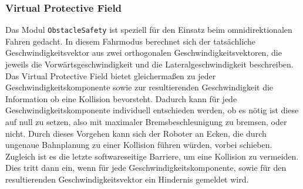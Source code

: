 \subsubsection{Virtual Protective Field}
\label{bahnplanung_virtual_protective_field_sec}

Das Modul \lstinline{ObstacleSafety} ist speziell für den Einsatz beim omnidirektionalen Fahren gedacht. In diesem Fahrmodus berechnet sich der tatsächliche Geschwindigkeitsvektor aus zwei orthogonalen Geschwindigkeitsvektoren, die jeweils die Vorwärtsgeschwindigkeit und die Lateralgeschwindigkeit beschreiben. Das Virtual Protective Field bietet gleichermaßen zu jeder Geschwindigkeitskomponente sowie zur resultierenden Geschwindigkeit die Information ob eine Kollision bevorsteht. Dadurch kann für jede Geschwindigkeitskomponente individuell entschieden werden, ob es nötig ist diese auf null zu setzen, also mit maximaler Bremsbeschleunigung zu bremsen, oder nicht. Durch dieses Vorgehen kann sich der Roboter an Ecken, die durch ungenaue Bahnplanung zu einer Kollision führen würden, vorbei schieben. Zugleich ist es die letzte softwareseitige Barriere, um eine Kollision zu vermeiden. Dies tritt dann ein, wenn für jede Geschwindigkeitskomponente, sowie für den resultierenden Geschwindigkeitsvektor ein Hindernis gemeldet wird.





